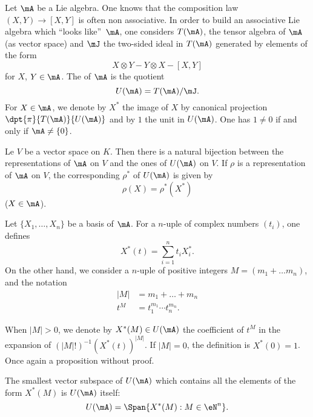 Let $\mA$ be a Lie algebra. One knows that the composition law $(X,Y)\to[X,Y]$ is often non associative. In order to build an associative Lie algebra which ``looks like''\ $\mA$, one considers $T(\mA)$, the tensor algebra of $\mA$ (as vector space) and $\mJ$ the two-sided ideal in $T(\mA)$ generated by elements of the form 
\[
   X\otimes Y-Y\otimes X -[X,Y]
\]
for $X$, $Y\in\mA$. The  of $\mA$ is the quotient  
\begin{equation}
     U(\mA)=T(\mA)/\mJ.
\end{equation}
For $X\in\mA$, we denote by $X^*$ the image of $X$ by canonical projection $\dpt{\pi}{T(\mA)}{U(\mA)}$ and by $1$ the unit in $U(\mA)$. One has $1\neq 0$ if and only if $\mA\neq\{0\}$.

\begin{proposition}
Le $V$ be a vector space on $K$. Then there is a natural bijection between the representations of $\mA$ on $V$ and the ones of $U(\mA)$ on $V$. If $\rho$ is a representation of $\mA$ on $V$, the corresponding $\rho^*$ of $U(\mA)$ is given by
\[
   \rho(X)=\rho^*(X^*)
\]
($X\in\mA$).
\end{proposition}

Let $\{X_1,\ldots,X_n\}$ be a basis of $\mA$. For a $n$-uple of complex numbers $(t_i)$, one defines
\begin{equation}
X^*(t)=\sum_{i=1}^nt_iX^*_i.
\end{equation}
On the other hand, we consider a $n$-uple of positive integers $M=(m_1+\ldots m_n)$, and the notation 
\begin{equation}
\begin{split}
   |M|&=m_1+\ldots+m_n\\
   t^M&=t_1^{m_1}\cdots t_n^{m_n}.
\end{split}
\end{equation}

When $|M|>0$, we denote by $X^*(M)\in U(\mA)$ the coefficient of $t^M$ in the expansion of $(|M|!)^{-1} (X^*(t))^{|M|}$. If $|M|=0$, the definition is $X^*(0)=1$. Once again a proposition without proof.

\begin{proposition}
The smallest vector subspace of $U(\mA)$ which contains all the elements of the form $X^*(M)$ is $U(\mA)$ itself:
\[
   U(\mA)=\Span\{ X^*(M):M\in \eN^n \}.
\]
\end{proposition}

